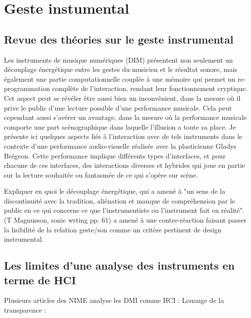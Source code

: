 %
\chapter{Geste instumental}
\label{ch:transparency}


\section{Revue des théories sur le geste instrumental}


Les instruments de musique numériques (DIM) présentent non seulement un découplage énergétique entre les gestes du musicien et le résultat sonore, mais également une partie computationnelle couplée à une mémoire qui permet un re-programmation complète de l'interaction, rendant leur fonctionnement cryptique. Cet aspect peut se révéler être aussi bien un inconvénient, dans la mesure où il prive le public d’une lecture possible d’une performance musicale. Cela peut cependant aussi s’avérer un avantage, dans la mesure où la performance musicale comporte une part scénographique dans laquelle l’illusion a toute sa place.
Je présente ici quelques aspects liés à l’interaction avec de tels instruments dans le contexte d’une performance audio-visuelle réalisée avec la plasticienne Gladys Brégeon. Cette performance implique différents types d’interfaces, et pour chacune de ces interfaces, des interactions diverses et hybrides qui joue en partie sur la lecture souhaitée ou fantasmée de ce qui s’opère sur scène.

Expliquer en quoi le découplage énergétique, qui a amené à "un sens de la discontinuité avec la tradition, aliénation et manque de compréhension par le public en ce qui concerne ce que l'instrumentiste ou l'instrument fait en réalité". (T Magnusson, sonic wrting pp. 61) a amené à une contre-réaction faisant passer la lisibilité de la relation geste/son comme un critère pertinent de design instrumental.

\section{Les limites d'une analyse des instruments en terme de HCI}
\label{sec:transparency:limitesHCI}

Plusieurs articles des NIME analyse les DMI comme HCI : 
Louange de la transparence : \cite{fels_mapping_2002}

